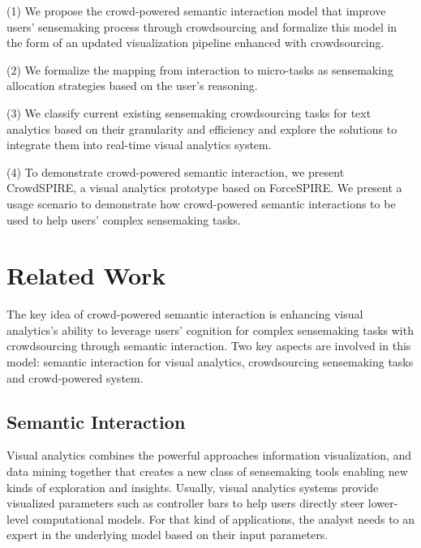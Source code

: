 \documentclass[journal]{vgtc}                %
\begin{document}
(1) We propose the crowd-powered semantic interaction model that improve users' sensemaking process through crowdsourcing and formalize this model in the form of an updated visualization pipeline enhanced with crowdsourcing.

(2) We formalize the mapping from interaction to micro-tasks as sensemaking allocation strategies based on the user’s reasoning.

(3) We classify current existing sensemaking crowdsourcing tasks for text analytics based on their granularity and efficiency and explore the solutions to integrate them into real-time visual analytics system.

(4) To demonstrate crowd-powered semantic interaction, we present CrowdSPIRE, a visual analytics prototype based on ForceSPIRE. We present a usage scenario to demonstrate how crowd-powered semantic interactions to be used to help users' complex sensemaking tasks.



\section{Related Work}

The key idea of crowd-powered semantic interaction is enhancing visual analytics's ability to leverage users' cognition for complex sensemaking tasks with crowdsourcing through semantic interaction. Two key aspects are involved in this model: semantic interaction for visual analytics, crowdsourcing sensemaking tasks and crowd-powered system\cite{Bernstein2012}.

\subsection{Semantic Interaction}



Visual analytics\cite{Thomas2005} combines the powerful approaches information visualization, and data mining together that creates a new class of sensemaking tools enabling new kinds of exploration and insights. Usually, visual analytics systems provide visualized parameters such as controller bars\cite{Jeong:2009gc} to help users directly steer lower-level computational models. For that kind of applications, the analyst needs to an expert in the underlying model based on their input parameters.
\end{document}
